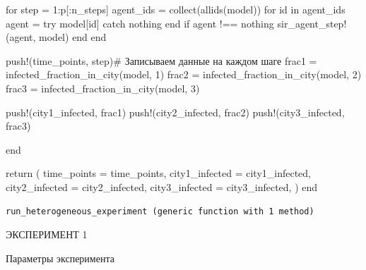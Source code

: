 \documentclass[
  12pt,
  a4paper,
  DIV=11,
  numbers=noendperiod]{scrreprt}
\newenvironment{Shaded}{\begin{snugshade}}{\end{snugshade}}
\newcommand{\CommentTok}[1]{\textcolor[rgb]{0.37,0.37,0.37}{#1}}
\newcommand{\ConstantTok}[1]{\textcolor[rgb]{0.56,0.35,0.01}{#1}}
\newcommand{\ControlFlowTok}[1]{\textcolor[rgb]{0.00,0.23,0.31}{#1}}
\newcommand{\FloatTok}[1]{\textcolor[rgb]{0.68,0.00,0.00}{#1}}
\newcommand{\FunctionTok}[1]{\textcolor[rgb]{0.28,0.35,0.67}{#1}}
\newcommand{\KeywordTok}[1]{\textcolor[rgb]{0.00,0.23,0.31}{#1}}
\newcommand{\NormalTok}[1]{\textcolor[rgb]{0.00,0.23,0.31}{#1}}
\newcommand{\OperatorTok}[1]{\textcolor[rgb]{0.37,0.37,0.37}{#1}}
\begin{document}
\begin{Shaded}
\begin{Highlighting}[]
    \ControlFlowTok{for}\NormalTok{ step }\OperatorTok{=} \FloatTok{1}\OperatorTok{:}\NormalTok{p[}\OperatorTok{:}\NormalTok{n\_steps]}
\NormalTok{        agent\_ids }\OperatorTok{=} \FunctionTok{collect}\NormalTok{(}\FunctionTok{allids}\NormalTok{(model))}
        \ControlFlowTok{for}\NormalTok{ id }\KeywordTok{in}\NormalTok{ agent\_ids}
\NormalTok{            agent }\OperatorTok{=} \ControlFlowTok{try}
\NormalTok{                model[id]}
            \ControlFlowTok{catch}
                \ConstantTok{nothing}
            \ControlFlowTok{end}
            \ControlFlowTok{if}\NormalTok{ agent }\OperatorTok{!==} \ConstantTok{nothing}
                \FunctionTok{sir\_agent\_step!}\NormalTok{(agent, model)}
            \ControlFlowTok{end}
        \ControlFlowTok{end}

        \FunctionTok{push!}\NormalTok{(time\_points, step)}\CommentTok{\# Записываем данные на каждом шаге}
\NormalTok{        frac1 }\OperatorTok{=} \FunctionTok{infected\_fraction\_in\_city}\NormalTok{(model, }\FloatTok{1}\NormalTok{)}
\NormalTok{        frac2 }\OperatorTok{=} \FunctionTok{infected\_fraction\_in\_city}\NormalTok{(model, }\FloatTok{2}\NormalTok{)}
\NormalTok{        frac3 }\OperatorTok{=} \FunctionTok{infected\_fraction\_in\_city}\NormalTok{(model, }\FloatTok{3}\NormalTok{)}

        \FunctionTok{push!}\NormalTok{(city1\_infected, frac1)}
        \FunctionTok{push!}\NormalTok{(city2\_infected, frac2)}
        \FunctionTok{push!}\NormalTok{(city3\_infected, frac3)}

    \ControlFlowTok{end}

    \ControlFlowTok{return}\NormalTok{ (}
\NormalTok{        time\_points }\OperatorTok{=}\NormalTok{ time\_points,}
\NormalTok{        city1\_infected }\OperatorTok{=}\NormalTok{ city1\_infected,}
\NormalTok{        city2\_infected }\OperatorTok{=}\NormalTok{ city2\_infected,}
\NormalTok{        city3\_infected }\OperatorTok{=}\NormalTok{ city3\_infected,}
\NormalTok{    )}
\KeywordTok{end}
\end{Highlighting}
\end{Shaded}

\begin{verbatim}
run_heterogeneous_experiment (generic function with 1 method)
\end{verbatim}

ЭКСПЕРИМЕНТ 1

Параметры эксперимента
\end{document}
